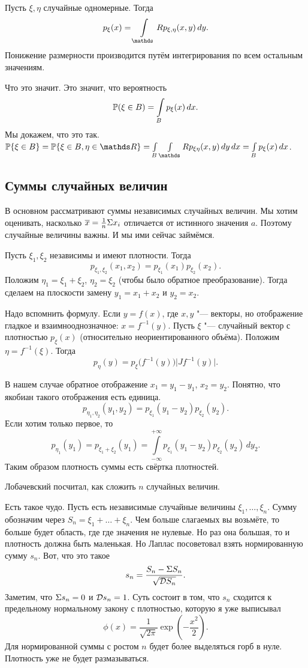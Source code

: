 Пусть $\xi,\eta$ случайные одномерные. Тогда
\[
  p_\xi(x) = \int\limits_\R p_{\xi,\eta}(x,y)\,dy.
\]
Понижение размерности производится путём интегрирования по всем остальным значениям.
\begin{Proof}
  Что это значит. Это значит, что вероятность
\[
  \P(\xi\in B) = \int\limits_Bp_\xi(x)\,dx.
\]
Мы докажем, что это так. $\P\{\xi\in B\} = \P\{\xi\in B,\eta\in \R\} = \int\limits_B \int\limits_\R p_{\xi\eta}(x,y)\,dy\,dx = \int\limits_Bp_\xi(x)\,dx$.
\end{Proof}

\subsection{Суммы случайных величин}
В основном рассматривают суммы независимых случайных величин. Мы хотим оценивать, насколько $\ol x = \frac1n\Sigma x_i$ отличается от истинного значения $a$. Поэтому случайные величины важны. И мы ими сейчас займёмся.

Пусть $\xi_1,\xi_2$ независимы и имеют плотности. Тогда
\[
  p_{\xi_1,\xi_2}(x_1,x_2) = p_{\xi_1}(x_1)p_{\xi_2}(x_2).
\]
Положим $\eta_1 = \xi_1+\xi_2$, $\eta_2 = \xi_2$ (чтобы было обратное преобразование). Тогда сделаем на плоскости замену $y_1 = x_1 + x_2$ и $y_2 = x_2$.

Надо вспомнить формулу. Если $y = f(x)$, где $x,y$ "--- векторы, но отображение гладкое и взаимнооднозначное: $x = f^{-1}(y)$. Пусть $\xi$ "--- случайный вектор с плотностью $p_\xi(x)$ (относительно неориентированного объёма). Положим $\eta = f^{-1}(\xi)$. Тогда
\[
  p_\eta(y) = p_\xi\big(f^{-1}(y)\big)\big| Jf^{-1}(y)\big|.
\]

В нашем случае обратное отображение $x_1 = y_1 - y_1$, $x_2 = y_2$. Понятно, что якобиан такого отображения есть единица.
\[
  p_{\eta_1,\eta_2}(y_1,y_2) = p_{\xi_1}(y_1-y_2) p_{\xi_2}(y_2).
\]
Если хотим только первое, то
\[
  p_{\eta_1}(y_1) = p_{\xi_1+\xi_2}(y_1) = \int\limits_{-\infty}^{+\infty} p_{\xi_1}(y_1-y_2)p_{\xi_2}(y_2)\,dy_2.
\]
Таким образом плотность суммы есть свёртка плотностей.

Лобачевский посчитал, как сложить $n$ случайных величин.

Есть такое чудо. Пусть есть независимые случайные величины $\xi_1,\dots,\xi_n$. Сумму обозначим через $S_n = \xi_1+\dots+\xi_n$. Чем больше слагаемых вы возьмёте, то больше будет область, где где значения не нулевые. Но раз она большая, то и плотность должна быть маленькая. Но Лаплас посоветовал взять нормированную сумму $s_n$. Вот, что это такое
\[
  s_n = \frac{ S_n - \E S_n}{\sqrt{\D S_n}}.
\]
Заметим, что $\E s_n = 0$ и $\D s_n = 1$. Суть состоит в том, что $s_n$ сходится к предельному нормальному закону с плотностью, которую я уже выписывал
\[
  \phi(x) = \frac{1}{\sqrt{2\pi}}\exp\left( -\frac{x^2}{2} \right).
\]
Для нормированной суммы с ростом $n$ будет более выделяться горб в нуле. Плотность уже не будет размазываться.

